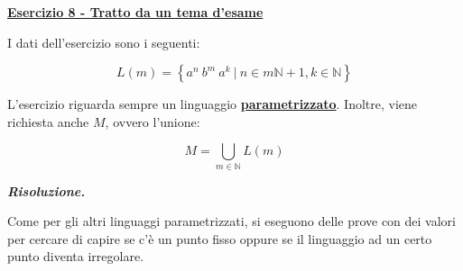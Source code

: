 \documentclass[a4paper]{article}
\begin{document}
	\newpage
	
	\noindent
	\textcolor{Red3}{\textbf{\underline{Esercizio 8 - Tratto da un tema d'esame}}}\newline
	
	\noindent
	I dati dell'esercizio sono i seguenti:
	
	\begin{equation*}
		L\left(m\right) = \left\{ a^{n} \: b^{m} \: a^{k} \: \left| \: n \in m \mathbb{N} + 1, k \in \mathbb{N} \right.\right\}
	\end{equation*}\newline
	
	\noindent
	L'esercizio riguarda sempre un linguaggio \textbf{\underline{parametrizzato}}. Inoltre, viene richiesta anche $M$, ovvero l'unione:
	
	\begin{equation*}
		M = \bigcup_{m \in \mathbb{N}} L\left(m\right)
	\end{equation*}
	\:\newline
	
	\noindent
	\textcolor{Green4}{\textbf{\emph{Risoluzione.}}}\newline
	
	\noindent
	Come per gli altri linguaggi parametrizzati, si eseguono delle prove con dei valori per cercare di capire se c'è un punto fisso oppure se il linguaggio ad un certo punto diventa irregolare.
	
\end{document}
